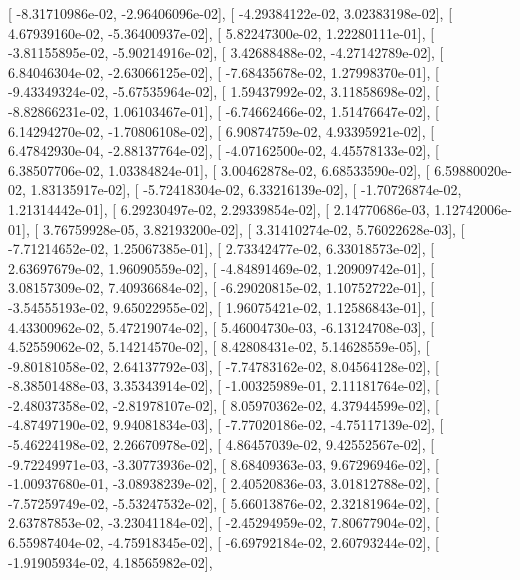 \documentclass{article}
\begin{document}
       [ -8.31710986e-02,  -2.96406096e-02],
       [ -4.29384122e-02,   3.02383198e-02],
       [  4.67939160e-02,  -5.36400937e-02],
       [  5.82247300e-02,   1.22280111e-01],
       [ -3.81155895e-02,  -5.90214916e-02],
       [  3.42688488e-02,  -4.27142789e-02],
       [  6.84046304e-02,  -2.63066125e-02],
       [ -7.68435678e-02,   1.27998370e-01],
       [ -9.43349324e-02,  -5.67535964e-02],
       [  1.59437992e-02,   3.11858698e-02],
       [ -8.82866231e-02,   1.06103467e-01],
       [ -6.74662466e-02,   1.51476647e-02],
       [  6.14294270e-02,  -1.70806108e-02],
       [  6.90874759e-02,   4.93395921e-02],
       [  6.47842930e-04,  -2.88137764e-02],
       [ -4.07162500e-02,   4.45578133e-02],
       [  6.38507706e-02,   1.03384824e-01],
       [  3.00462878e-02,   6.68533590e-02],
       [  6.59880020e-02,   1.83135917e-02],
       [ -5.72418304e-02,   6.33216139e-02],
       [ -1.70726874e-02,   1.21314442e-01],
       [  6.29230497e-02,   2.29339854e-02],
       [  2.14770686e-03,   1.12742006e-01],
       [  3.76759928e-05,   3.82193200e-02],
       [  3.31410274e-02,   5.76022628e-03],
       [ -7.71214652e-02,   1.25067385e-01],
       [  2.73342477e-02,   6.33018573e-02],
       [  2.63697679e-02,   1.96090559e-02],
       [ -4.84891469e-02,   1.20909742e-01],
       [  3.08157309e-02,   7.40936684e-02],
       [ -6.29020815e-02,   1.10752722e-01],
       [ -3.54555193e-02,   9.65022955e-02],
       [  1.96075421e-02,   1.12586843e-01],
       [  4.43300962e-02,   5.47219074e-02],
       [  5.46004730e-03,  -6.13124708e-03],
       [  4.52559062e-02,   5.14214570e-02],
       [  8.42808431e-02,   5.14628559e-05],
       [ -9.80181058e-02,   2.64137792e-03],
       [ -7.74783162e-02,   8.04564128e-02],
       [ -8.38501488e-03,   3.35343914e-02],
       [ -1.00325989e-01,   2.11181764e-02],
       [ -2.48037358e-02,  -2.81978107e-02],
       [  8.05970362e-02,   4.37944599e-02],
       [ -4.87497190e-02,   9.94081834e-03],
       [ -7.77020186e-02,  -4.75117139e-02],
       [ -5.46224198e-02,   2.26670978e-02],
       [  4.86457039e-02,   9.42552567e-02],
       [ -9.72249971e-03,  -3.30773936e-02],
       [  8.68409363e-03,   9.67296946e-02],
       [ -1.00937680e-01,  -3.08938239e-02],
       [  2.40520836e-03,   3.01812788e-02],
       [ -7.57259749e-02,  -5.53247532e-02],
       [  5.66013876e-02,   2.32181964e-02],
       [  2.63787853e-02,  -3.23041184e-02],
       [ -2.45294959e-02,   7.80677904e-02],
       [  6.55987404e-02,  -4.75918345e-02],
       [ -6.69792184e-02,   2.60793244e-02],
       [ -1.91905934e-02,   4.18565982e-02],
\end{document}
